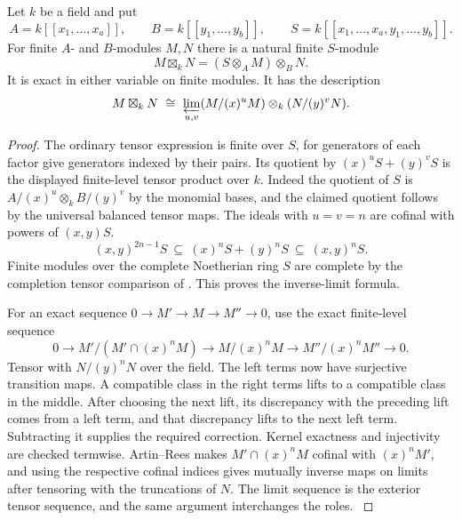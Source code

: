 \begin{proposition}\label{res:I07}
Let \(k\) be a field and put
\[
 A=k[[x_1,\ldots,x_a]],\qquad B=k[[y_1,\ldots,y_b]],
 \qquad S=k[[x_1,\ldots,x_a,y_1,\ldots,y_b]] .
\]
For finite \(A\)- and \(B\)-modules \(M,N\) there is a natural finite
\(S\)-module
\[
 M\boxtimes_k N=(S\otimes_A M)\otimes_B N.
\]
It is exact in either variable on finite modules. It has the
description
\[
 M\boxtimes_k N
   \ \cong\
 \varprojlim_{u,v}
   (M/(x)^uM)\otimes_k(N/(y)^vN).
\]
\end{proposition}
\begin{proof}
The ordinary tensor expression is finite over \(S\), for generators
of each factor give generators indexed by their pairs. Its quotient by
\((x)^uS+(y)^vS\) is the displayed finite-level tensor product over \(k\).
Indeed the quotient of \(S\) is
\(A/(x)^u\otimes_k B/(y)^v\) by the monomial bases, and the claimed
quotient follows by the universal balanced tensor maps.
The ideals with \(u=v=n\) are cofinal with powers of \((x,y)S\).
\[
 (x,y)^{2n-1}S\ \subseteq\ (x)^nS+(y)^nS\
             \subseteq\ (x,y)^nS .
\]
Finite modules over the complete Noetherian ring \(S\) are complete
by the completion tensor comparison of
\cite[ALG-05-C04-R03]{p103}. This proves the inverse-limit formula.

For an exact sequence \(0\to M'\to M\to M''\to0\), use the exact
finite-level sequence
\[
 0\to M'/(M'\cap(x)^nM)\to M/(x)^nM\to M''/(x)^n M''\to0 .
\]
Tensor with \(N/(y)^nN\) over the field. The left terms now have
surjective transition maps. A compatible class in the right terms
lifts to a compatible class in the middle. After choosing the
next lift, its discrepancy with the preceding lift comes from a
left term, and that discrepancy lifts to the next left term.
Subtracting it supplies the required correction. Kernel exactness
and injectivity are checked termwise. Artin--Rees makes
\(M'\cap(x)^nM\) cofinal with \((x)^nM'\), and using the respective
cofinal indices gives mutually inverse maps on limits after tensoring
with the truncations of \(N\). The limit sequence is the exterior
tensor sequence, and the same argument interchanges the roles.
\cite[Chapter V, \S B.2]{serre-local}
\end{proof}

